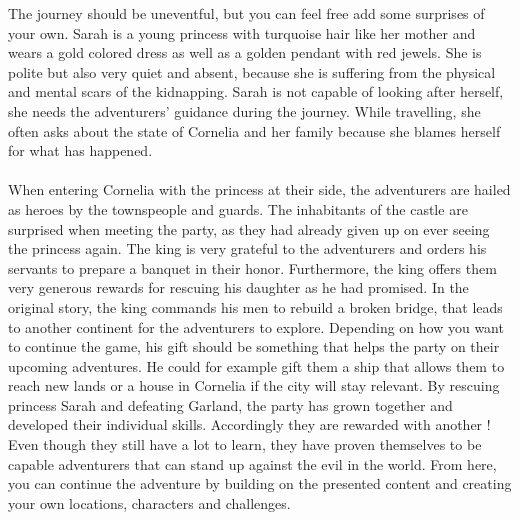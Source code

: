 The journey should be uneventful, but you can feel free add some surprises of your own.
Sarah is a young princess with turquoise hair like her mother and wears a gold colored dress as well as a golden pendant with red jewels.
She is polite but also very quiet and absent, because she is suffering from the physical and mental scars of the kidnapping.
Sarah is not capable of looking after herself, she needs the adventurers' guidance during the journey.
While travelling, she often asks about the state of Cornelia and her family because she blames herself for what has happened.
%
\vfill
%
\\\\
%
When entering Cornelia with the princess at their side, the adventurers are hailed as heroes by the townspeople and guards.
The inhabitants of the castle are surprised when meeting the party, as they had already given up on ever seeing the princess again.
The king is very grateful to the adventurers and orders his servants to prepare a banquet in their honor.
Furthermore, the king offers them very generous rewards for rescuing his daughter as he had promised.
In the original story, the king commands his men to rebuild a broken bridge, that leads to another  continent for the adventurers to explore.
Depending on how you want to continue the game, his gift should be something that helps the party on their upcoming adventures.
He could for example gift them a ship that allows them to reach new lands or a house in Cornelia if the city will stay relevant.
By rescuing princess Sarah and defeating Garland, the party has grown together and developed their individual skills.
Accordingly they are rewarded with another !
Even though they still have a lot to learn, they have proven themselves to be capable adventurers that can stand up against the evil in the world.
From here, you can continue the adventure by building on the presented content and creating your own locations, characters and challenges.
%
\clearpage